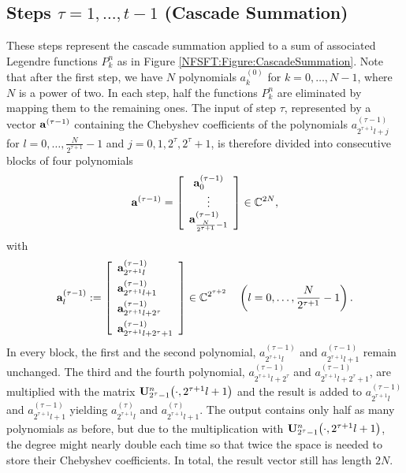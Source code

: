 \subsection[Cascade Summation]{Steps $\tau = 1,\ldots,t-1$ (Cascade Summation)}
These steps represent the cascade summation applied to a sum of associated Legendre functions $P_{k}^n$ as in Figure 
\ref{NFSFT:Figure:CascadeSummation}. Note that after the first step, we have $N$ polynomials $a_{k}^{(0)}$ for
$k=0,\ldots,N-1$, where $N$ is a power of two. In each step, half the functions $P_{k}^n$ are eliminated 
by mapping them to the remaining ones. The input of step $\tau$, represented by a vector $\mathbf{a}^{(\tau-1)}$ 
containing the Chebyshev coefficients of the polynomials $a_{2^{\tau+1}l+j}^{(\tau-1)}$ 
for $l=0,\ldots,\frac{N}{2^{\tau+1}}-1$ and $j=0,1,2^{\tau},2^{\tau}+1$, is therefore divided into 
consecutive blocks of four polynomials
\[
  \mathbf{a}^{(\tau-1)} = 
    \left[\begin{array}{c}
      \mathbf{a}^{(\tau-1)}_{0}\\
      \vdots\\
      \mathbf{a}^{(\tau-1)}_{\frac{N}{2^{\tau+1}}-1}
    \end{array}\right]  \in \mathbb{C}^{2N},
\]
with
\begin{equation}
  \nonumber
  \mathbf{a}^{(\tau-1)}_{l} := 
    \left[\begin{array}{l}
      \mathbf{a}^{(\tau-1)}_{2^{\tau+1}l}\\[1ex]
      \mathbf{a}^{(\tau-1)}_{2^{\tau+1}l+1}\\[1ex]
      \mathbf{a}^{(\tau-1)}_{2^{\tau+1}l+2^{\tau}}\\[1ex]
      \mathbf{a}^{(\tau-1)}_{2^{\tau+1}l+2^{\tau}+1}
    \end{array}\right] \in \mathbb{C}^{2^{\tau+2}} \quad \left(l=0,\ldots,\frac{N}{2^{\tau+1}}-1\right).
\end{equation}
In every block, the first and the second polynomial, $a^{(\tau-1)}_{2^{\tau+1}l}$
and $a^{(\tau-1)}_{2^{\tau+1}l+1}$ remain unchanged. The third and the fourth polynomial, $a^{(\tau-1)}_{2^{\tau+1}l+2^{\tau}}$ 
and $a^{(\tau-1)}_{2^{\tau+1}l+2^{\tau}+1}$, are multiplied with the matrix $\mathbf{U}_{2^{\tau}-1}^{n}{\hspace{-0.4ex}}\left(\cdot,2^{\tau+1}l+1\right)$ 
and the result is added to $a^{(\tau-1)}_{2^{\tau+1}l}$ and $a^{(\tau-1)}_{2^{\tau+1}l+1}$ yielding $a^{(\tau)}_{2^{\tau+1}l}$ and $a^{(\tau)}_{2^{\tau+1}l+1}$. The output contains 
only half as many polynomials as before, but due to the multiplication with $\mathbf{U}_{2^{\tau}-1}^{n}{\hspace{-0.4ex}}\left(\cdot,2^{\tau+1}l+1\right)$, 
the degree might nearly double each time so that twice the space is needed to store their Chebyshev coefficients. In total, the result vector still has length $2N$. 
 
